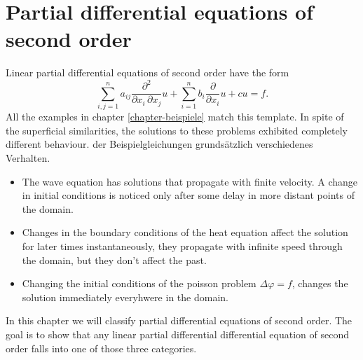 %
%
%
\chapter{Partial differential equations of second order\label{chapter-2ordnung}}
Linear partial differential equations of second order have the form
\begin{equation}
\sum_{i,j=1}^na_{ij}\frac{\partial^2}{\partial x_i\,\partial x_j} u
+
\sum_{i=1}^nb_i\frac{\partial}{\partial x_i} u+cu=f.
\label{operator2ordnung}
\end{equation}
All the examples in chapter
\ref{chapter-beispiele}
match this template.
In spite of the superficial similarities, the solutions to these problems
exhibited completely different behaviour.
der Beispielgleichungen grundsätzlich verschiedenes Verhalten.
\begin{itemize}
\item The wave equation has solutions that propagate with finite 
velocity.
A change in initial conditions is noticed only after some delay in more
distant points of the domain.
\item
Changes in the boundary conditions of the heat equation affect the solution
for later times instantaneously, they propagate with infinite speed through
the domain, but they don't affect the past.
\item
Changing the initial conditions of the poisson problem
$\Delta \varphi=f$,
changes the solution immediately everyhwere in the domain.
\end{itemize}
In this chapter we will classify partial differential equations of
second order.
The goal is to show that any linear partial differential differential
equation of second order falls into one of those three categories.






